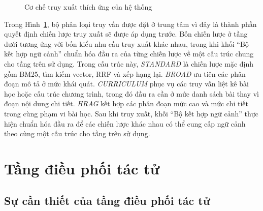 \documentclass[../DoAn.tex]{subfiles}
\begin{document}
\begin{figure}[H]
{
}
\caption{Cơ chế truy xuất thích ứng của hệ thống}
\label{fig:method-adaptive-rag}
\end{figure}

Trong Hình~\ref{fig:method-adaptive-rag}, bộ phân loại truy vấn được đặt ở trung tâm vì đây là thành phần quyết định chiến lược truy xuất sẽ được áp dụng trước. Bốn chiến lược ở tầng dưới tương ứng với bốn kiểu nhu cầu truy xuất khác nhau, trong khi khối ``Bộ kết hợp ngữ cảnh'' chuẩn hóa đầu ra của từng chiến lược về một cấu trúc chung cho tầng trên sử dụng.
Trong cấu trúc này, \textit{STANDARD} là chiến lược mặc định gồm BM25, tìm kiếm vector, RRF và xếp hạng lại. \textit{BROAD} ưu tiên các phân đoạn mô tả ở mức khái quát. \textit{CURRICULUM} phục vụ các truy vấn liệt kê bài học hoặc cấu trúc chương trình, trong đó đầu ra cần ở mức danh sách bài thay vì đoạn nội dung chi tiết. \textit{HRAG} kết hợp các phân đoạn mức cao và mức chi tiết trong cùng phạm vi bài học. Sau khi truy xuất, khối ``Bộ kết hợp ngữ cảnh'' thực hiện chuẩn hóa đầu ra để các chiến lược khác nhau có thể cung cấp ngữ cảnh theo cùng một cấu trúc cho tầng trên sử dụng.

\section{Tầng điều phối tác tử}

\subsection{Sự cần thiết của tầng điều phối tác tử}
\end{document}

